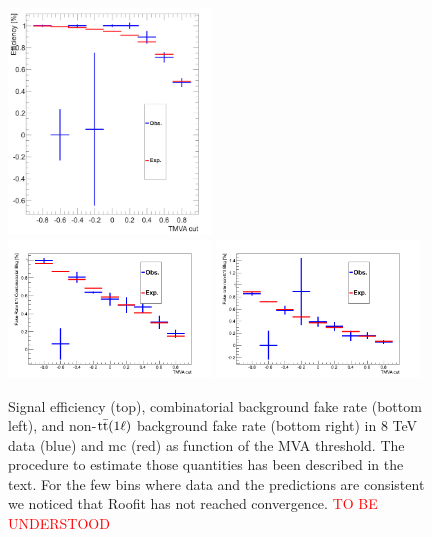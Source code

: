  \begin{figure}[htbp]
	\centering
	\includegraphics[width=0.48\textwidth]{figures/TOPRESOLVEDTAGGER/c_eff.png}\\
	\includegraphics[width=0.48\textwidth]{figures/TOPRESOLVEDTAGGER/c_fr1.png}
	\includegraphics[width=0.48\textwidth]{figures/TOPRESOLVEDTAGGER/c_fr2.png}
	\caption{Signal efficiency (top),  combinatorial background fake rate (bottom left), and non-$\mathrm{t}\bar{\mathrm{t}}(1\ell)$ background fake rate (bottom right) in 8 TeV data (blue) and mc (red) as function of the MVA threshold. The procedure to estimate those quantities has been described in the text. For the few bins where data and the predictions are consistent we noticed that Roofit has not reached convergence. \textcolor{red}{TO BE UNDERSTOOD}}
	\label{fig:roofitresults13TeV}
\end{figure}